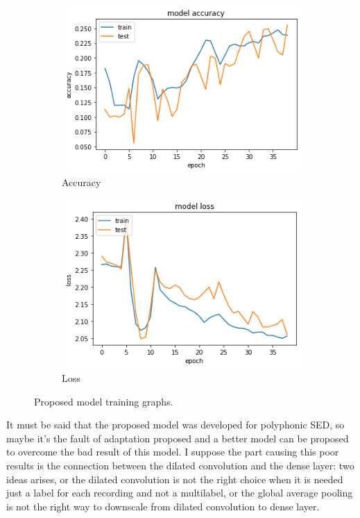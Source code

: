 \documentclass{article}
\begin{document}
\begin{figure}[H]
	\centering
	\begin{subfigure}{.5\textwidth}
		\centering
		\includegraphics[width=.9\linewidth]{./images/mono/new_model_acc.png}
		\caption{Accuracy}
	\end{subfigure}%
	\begin{subfigure}{.5\textwidth}
		\centering
		\includegraphics[width=.9\linewidth]{./images/mono/new_model_loss.png}
		\caption{Loss}
	\end{subfigure}
	\caption{Proposed model training graphs.}
	\label{fig:mono_new_result}
\end{figure}

It must be said that the proposed model was developed for polyphonic SED, so maybe it's the fault of adaptation proposed and a better model can be proposed to overcome the bad result of this model. I suppose the part causing this poor results is the connection between the dilated convolution and the dense layer: two ideas arises, or the dilated convolution is not the right choice when it is needed just a label for each recording and not a multilabel, or the global average pooling is not the right way to downscale from dilated convolution to dense layer.
\end{document}
